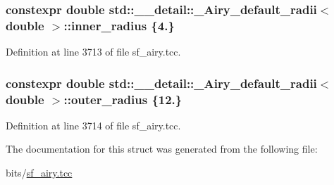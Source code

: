\subsubsection[{\texorpdfstring{inner\+\_\+radius}{inner_radius}}]{\setlength{\rightskip}{0pt plus 5cm}constexpr double {\bf std\+::\+\_\+\+\_\+detail\+::\+\_\+\+Airy\+\_\+default\+\_\+radii}$<$ double $>$\+::inner\+\_\+radius \{4.\}\hspace{0.3cm}{\ttfamily [static]}}\hypertarget{structstd_1_1____detail_1_1__Airy__default__radii_3_01double_01_4_a1c16ae812de7fce0a39bc3b094767b87}{}\label{structstd_1_1____detail_1_1__Airy__default__radii_3_01double_01_4_a1c16ae812de7fce0a39bc3b094767b87}


Definition at line 3713 of file sf\+\_\+airy.\+tcc.

\subsubsection[{\texorpdfstring{outer\+\_\+radius}{outer_radius}}]{\setlength{\rightskip}{0pt plus 5cm}constexpr double {\bf std\+::\+\_\+\+\_\+detail\+::\+\_\+\+Airy\+\_\+default\+\_\+radii}$<$ double $>$\+::outer\+\_\+radius \{12.\}\hspace{0.3cm}{\ttfamily [static]}}\hypertarget{structstd_1_1____detail_1_1__Airy__default__radii_3_01double_01_4_a0d0c981d84c034afb18aa533bd6a9a52}{}\label{structstd_1_1____detail_1_1__Airy__default__radii_3_01double_01_4_a0d0c981d84c034afb18aa533bd6a9a52}


Definition at line 3714 of file sf\+\_\+airy.\+tcc.



The documentation for this struct was generated from the following file\+:\begin{DoxyCompactItemize}
\item 
bits/\hyperlink{sf__airy_8tcc}{sf\+\_\+airy.\+tcc}\end{DoxyCompactItemize}
